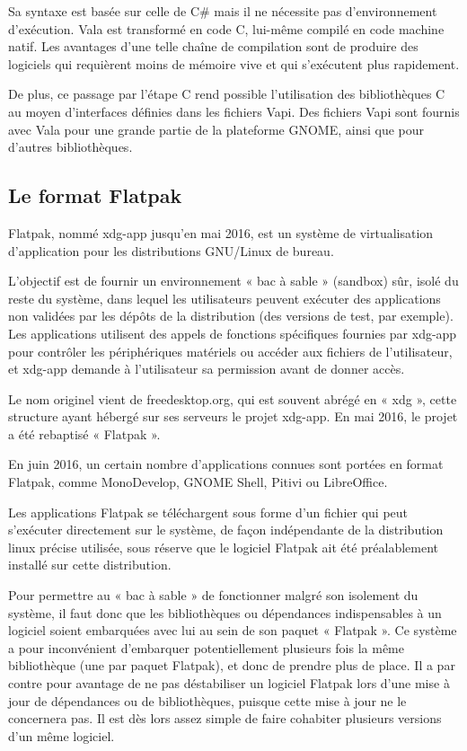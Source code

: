 \documentclass[12pt]{report}
\begin{document}
Sa syntaxe est basée sur celle de C\# mais il ne nécessite pas
d'environnement d'exécution. Vala est transformé en code C, lui-même
compilé en code machine natif. Les avantages d'une telle chaîne de
compilation sont de produire des logiciels qui requièrent moins de
mémoire vive et qui s'exécutent plus rapidement.

De plus, ce passage par l'étape C rend possible l'utilisation des
bibliothèques C au moyen d'interfaces définies dans les fichiers
Vapi. Des fichiers Vapi sont fournis avec Vala pour une grande partie
de la plateforme GNOME, ainsi que pour d'autres bibliothèques.

\subsection{Le format Flatpak}
Flatpak, nommé xdg-app jusqu’en mai 2016, est un système de
virtualisation d’application pour les distributions GNU/Linux de
bureau.

L'objectif est de fournir un environnement « bac à sable » (sandbox)
sûr, isolé du reste du système, dans lequel les utilisateurs peuvent
exécuter des applications non validées par les dépôts de la
distribution (des versions de test, par exemple). Les applications
utilisent des appels de fonctions spécifiques fournies par xdg-app
pour contrôler les périphériques matériels ou accéder aux fichiers de
l'utilisateur, et xdg-app demande à l'utilisateur sa permission avant
de donner accès.

Le nom originel vient de freedesktop.org, qui est souvent abrégé en «
xdg », cette structure ayant hébergé sur ses serveurs le projet
xdg-app. En mai 2016, le projet a été rebaptisé « Flatpak ».

En juin 2016, un certain nombre d'applications connues sont portées en
format Flatpak, comme MonoDevelop, GNOME Shell, Pitivi ou LibreOffice.

Les applications Flatpak se téléchargent sous forme d'un fichier qui
peut s’exécuter directement sur le système, de façon indépendante de
la distribution linux précise utilisée, sous réserve que le logiciel
Flatpak ait été préalablement installé sur cette distribution.

Pour permettre au « bac à sable » de fonctionner malgré son isolement
du système, il faut donc que les bibliothèques ou dépendances
indispensables à un logiciel soient embarquées avec lui au sein de son
paquet « Flatpak ». Ce système a pour inconvénient d'embarquer
potentiellement plusieurs fois la même bibliothèque (une par paquet
Flatpak), et donc de prendre plus de place. Il a par contre pour
avantage de ne pas déstabiliser un logiciel Flatpak lors d'une mise à
jour de dépendances ou de bibliothèques, puisque cette mise à jour ne
le concernera pas. Il est dès lors assez simple de faire cohabiter
plusieurs versions d'un même logiciel.
\end{document}
